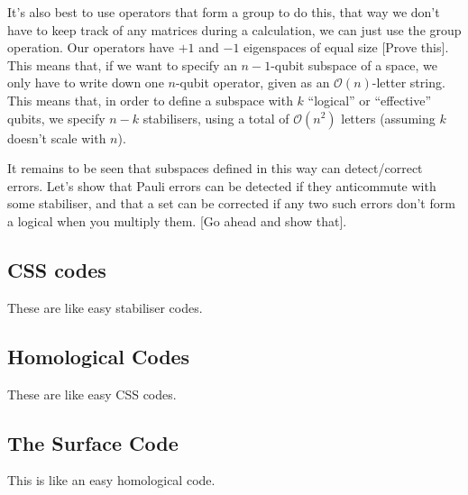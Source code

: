\documentclass[10pt,a4paper, english]{scrartcl}
\begin{document}
It's also best to use operators that form a group to do this, that way we don't have to keep track of any matrices during a calculation, we can just use the group operation. 
Our operators have $+1$ and $-1$ eigenspaces of equal size [Prove this]. 
This means that, if we want to specify an $n-1$-qubit subspace of a space, we only have to write down one $n$-qubit operator, given as an $\mathcal{O}(n)$-letter string. 
This means that, in order to define a subspace with $k$ ``logical'' or ``effective'' qubits, 
we specify $n-k$ stabilisers, using a total of $\mathcal{O}(n^2)$ letters (assuming $k$ doesn't scale with $n$).

It remains to be seen that subspaces defined in this way can detect/correct errors.
Let's show that Pauli errors can be detected if they anticommute with some stabiliser, and that a set can be corrected if any two such errors don't form a logical when you multiply them.
[Go ahead and show that].
\subsection{CSS codes}
These are like easy stabiliser codes.
\subsection{Homological Codes}
These are like easy CSS codes.
\subsection{The Surface Code}
This is like an easy homological code.
\end{document}
